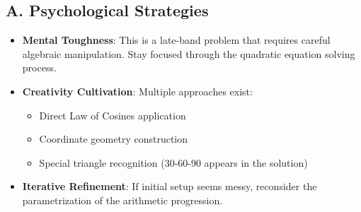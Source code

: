 \documentclass[12pt]{article}
\begin{document}
\begin{strategicbox}
\subsection*{A. Psychological Strategies}
\begin{itemize}[leftmargin=*]
    \item \textbf{Mental Toughness}: This is a late-band problem that requires careful algebraic manipulation. Stay focused through the quadratic equation solving process.
    \item \textbf{Creativity Cultivation}: Multiple approaches exist:
    \begin{itemize}
        \item Direct Law of Cosines application
        \item Coordinate geometry construction
        \item Special triangle recognition (30-60-90 appears in the solution)
    \end{itemize}
    \item \textbf{Iterative Refinement}: If initial setup seems messy, reconsider the parametrization of the arithmetic progression.
\end{itemize}


\end{strategicbox}
\end{document}
